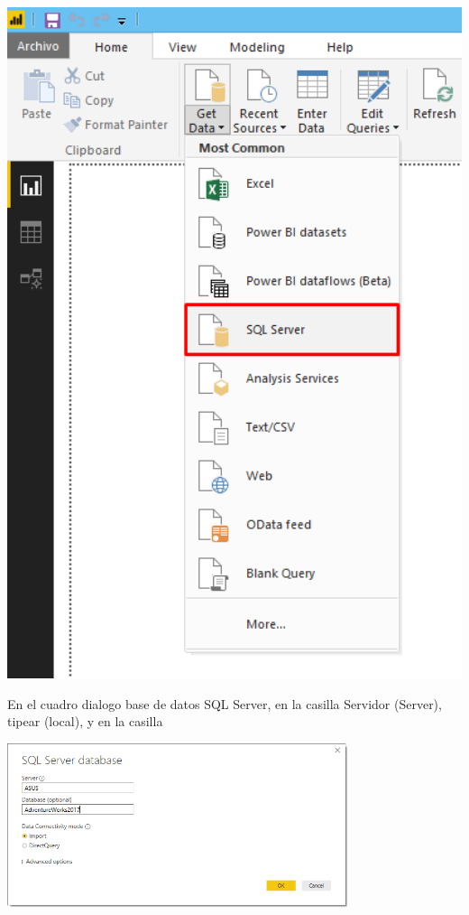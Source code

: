 \documentclass[12pt,letterpaper]{article}
\begin{document}
\begin{center}
    \includegraphics[width=16cm]{img/12.png}  
\end{center}
En el cuadro dialogo base de datos SQL Server, en la casilla Servidor (Server), tipear (local), y en la casilla
\begin{center}
    \includegraphics[width=10cm]{img/13.png}  
\end{center}
\end{document}
